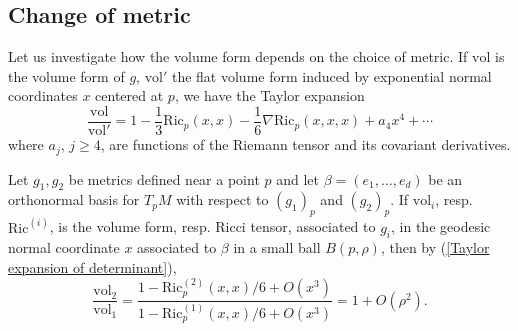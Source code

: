\documentclass[reqno,12pt,letterpaper]{amsart}
\newcommand{\Ric}{\mathrm{Ric}}
\DeclareMathOperator{\grad}{grad}
\newcommand{\vol}{\mathrm{vol}}
\theoremstyle{definition}
\numberwithin{equation}{section}
\begin{document}

\subsection{Change of metric}\label{change of metric}
Let us investigate how the volume form depends on the choice of metric.
If $\vol$ is the volume form of $g$, $\vol'$ the flat volume form induced by exponential normal coordinates $x$ centered at $p$, we have
the Taylor expansion \cite[p59]{chow2006hamilton}
\begin{equation}\label{Taylor expansion of determinant}
\frac{\vol}{\vol'} = 1 - \frac{1}{3} \Ric_p(x, x) - \frac{1}{6} \nabla \Ric_p(x, x, x) + a_4x^4 + \cdots
\end{equation}
where $a_j$, $j \geq 4$, are functions of the Riemann tensor and its covariant derivatives.

Let $g_1,g_2$ be metrics defined near a point $p$ and let $\beta = (e_1, \dots, e_d)$ be an orthonormal basis for $T_pM$ with respect to $(g_1)_p$ and $(g_2)_p$.
If $\vol_i$, resp. $\Ric^{(i)}$, is the volume form, resp. Ricci tensor, associated to $g_i$, in the geodesic normal coordinate $x$ associated to $\beta$ in a small ball $B(p, \rho)$, then by (\ref{Taylor expansion of determinant}),
\begin{equation}\label{change of volume form}
\frac{\vol_2}{\vol_1} = \frac{1 - \Ric_p^{(2)}(x, x)/6 + O(x^3)}{1 - \Ric_p^{(1)}(x, x)/6 + O(x^3)} = 1 + O(\rho^2).
\end{equation}

\end{document}
